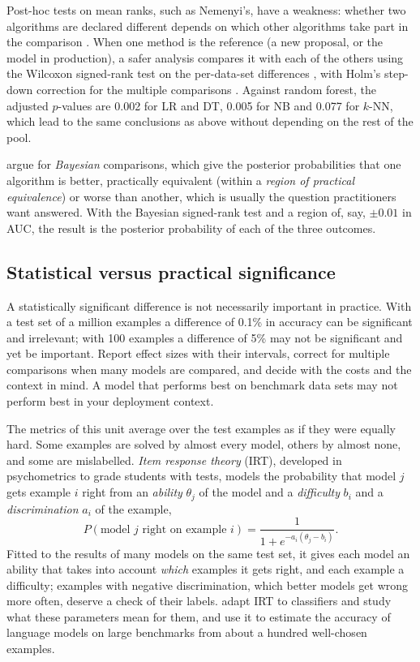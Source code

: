 Post-hoc tests on mean ranks, such as Nemenyi's, have a weakness: whether two algorithms are declared different
depends on which other algorithms take part in the comparison \citep{benavoli2016should}. When one method is the
reference (a new proposal, or the model in production), a safer analysis compares it with each of the others
using the Wilcoxon signed-rank test on the per-data-set differences \citep{wilcoxon1945individual}, with Holm's
step-down correction for the multiple comparisons \citep{holm1979simple}. Against random forest, the adjusted
$p$-values are 0.002 for LR and DT, 0.005 for NB and 0.077 for $k$-NN, which lead to the same conclusions as above without depending on the rest of the pool.

\citet{benavoli2017time} argue for \emph{Bayesian} comparisons, which give the posterior
probabilities that one algorithm is better, practically equivalent (within a \emph{region of
practical equivalence}) or worse than another, which is usually the question practitioners want answered. With the Bayesian signed-rank test and a region of, say, $\pm0.01$ in AUC, the result is the
posterior probability of each of the three outcomes.

\subsection{Statistical versus practical significance}

A statistically significant difference is not necessarily important in practice. With a test set of a million examples a
difference of 0.1\% in accuracy can be significant and irrelevant; with 100 examples a
difference of 5\% may not be significant and yet be important. Report effect sizes with their
intervals, correct for multiple comparisons when many models are compared, and decide with the
costs and the context in mind. A model that performs best on benchmark data sets may not perform best in your
deployment context.

\begin{further}
The metrics of this unit average over the test examples as if they were equally hard. Some
examples are solved by almost every model, others by almost none, and some are mislabelled.
\emph{Item response theory} (IRT), developed in psychometrics to grade
students with tests, models the probability that model $j$ gets example $i$ right from an
\emph{ability} $\theta_j$ of the model and a \emph{difficulty} $b_i$ and a \emph{discrimination} $a_i$ of
the example,
\[
P(\text{model $j$ right on example $i$})=\frac{1}{1+e^{-a_i(\theta_j-b_i)}} .
\]
Fitted to the results of many models on the same test set, it gives each model an ability that
takes into account \emph{which} examples it gets right, and each example a difficulty; examples
with negative discrimination, which better models get wrong more often, deserve a check of their
labels. \citet{martinezplumed2019item} adapt IRT to classifiers and study what these parameters
mean for them, and \citet{maiapolo2024tinybenchmarks} use it to estimate the accuracy of language
models on large benchmarks from about a hundred well-chosen examples.
\end{further}

